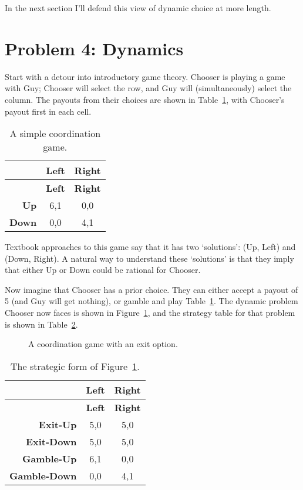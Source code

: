 \documentclass[
  10pt,
  letterpaper,
  DIV=11,
  numbers=noendperiod,
  twoside]{scrartcl}
\begin{document}
In the next section I'll defend this view of dynamic choice at more
length.

\section{Problem 4: Dynamics}\label{sec-dynamic}

Start with a detour into introductory game theory. Chooser is playing a
game with Guy; Chooser will select the row, and Guy will
(simultaneously) select the column. The payouts from their choices are
shown in Table~\ref{tbl-chooser-guy}, with Chooser's payout first in
each cell.

\begin{longtable}[]{@{}rcc@{}}
\caption{A simple coordination
game.}\label{tbl-chooser-guy}\tabularnewline
\toprule\noalign{}
& \textbf{Left} & \textbf{Right} \\
\midrule\noalign{}
\endfirsthead
\toprule\noalign{}
& \textbf{Left} & \textbf{Right} \\
\midrule\noalign{}
\endhead
\bottomrule\noalign{}
\endlastfoot
\textbf{Up} & 6,1 & 0,0 \\
\textbf{Down} & 0,0 & 4,1 \\
\end{longtable}

Textbook approaches to this game say that it has two `solutions': (Up,
Left) and (Down, Right). A natural way to understand these `solutions'
is that they imply that either Up or Down could be rational for Chooser.

Now imagine that Chooser has a prior choice. They can either accept a
payout of 5 (and Guy will get nothing), or gamble and play
Table~\ref{tbl-chooser-guy}. The dynamic problem Chooser now faces is
shown in Figure~\ref{fig-chooser-guy-two}, and the strategy table for
that problem is shown in Table~\ref{tbl-chooser-guy-two}.

\begin{figure}


\caption{\label{fig-chooser-guy-two}A coordination game with an exit
option.}

\end{figure}%

\begin{longtable}[]{@{}rcc@{}}
\caption{The strategic form of
Figure~\ref{fig-chooser-guy-two}.}\label{tbl-chooser-guy-two}\tabularnewline
\toprule\noalign{}
& \textbf{Left} & \textbf{Right} \\
\midrule\noalign{}
\endfirsthead
\toprule\noalign{}
& \textbf{Left} & \textbf{Right} \\
\midrule\noalign{}
\endhead
\bottomrule\noalign{}
\endlastfoot
\textbf{Exit-Up } & 5,0 & 5,0 \\
\textbf{Exit-Down } & 5,0 & 5,0 \\
\textbf{Gamble-Up } & 6,1 & 0,0 \\
\textbf{Gamble-Down} & 0,0 & 4,1 \\
\end{longtable}
\end{document}
